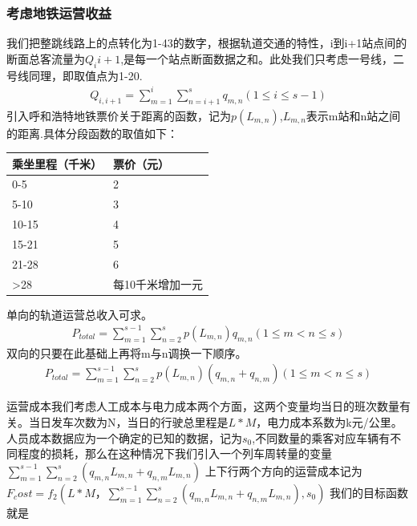 \documentclass[12pt,a4paper]{mcmthesis}
\begin{document}
\subsubsection{考虑地铁运营收益}
我们把整跳线路上的点转化为1-43的数字，根据轨道交通的特性，i到i+1站点间的断面总客流量为$Q_{i}{i+1}$,是每一个站点断面数据之和。此处我们只考虑一号线，二号线同理，即取值点为1-20.
\begin{equation}
	\begin{aligned}
		Q_{i,i+1}=\sum_{m=1}^{i}\sum_{n=i+1}^{s}q_{m,n}(1\leqslant i\leqslant s-1)
	\end{aligned}
\end{equation}
引入呼和浩特地铁票价关于距离的函数，记为$p(L_{m,n})$,$L_{m,n}$表示m站和n站之间的距离.具体分段函数的取值如下：
\begin{table}
	\centering
	\begin{tabular}{|l|l|}
		\hline
		乘坐里程（千米） & 票价（元） \\ \hline
		0-5 & 2 \\ \hline
		5-10 & 3 \\ \hline
		10-15 & 4 \\ \hline
		15-21 & 5 \\ \hline
		21-28 & 6 \\ \hline
		>28 &  每10千米增加一元 \\ \hline
	\end{tabular}
\end{table}
单向的轨道运营总收入可求。
\begin{equation}
	\begin{aligned}
		P_{total}=\sum_{m=1}^{s-1}\sum_{n=2}^{s}p(L_{m,n})q_{m,n} (1\leqslant m< n\leq s)
	\end{aligned}
\end{equation}
双向的只要在此基础上再将m与n调换一下顺序。
\begin{equation}
	\begin{aligned}
	P_{total}=\sum_{m=1}^{s-1}\sum_{n=2}^{s}p(L_{m,n})(q_{m,n}+q_{n,m}) (1\leqslant m< n\leq s)
	\end{aligned}
\end{equation}

运营成本我们考虑人工成本与电力成本两个方面，这两个变量均当日的班次数量有关。当日发车次数为N，当日的行驶总里程是$L*M$，电力成本系数为k元/公里。人员成本数据应为一个确定的已知的数据，记为$s_0$,不同数量的乘客对应车辆有不同程度的损耗，那么在这种情况下我们引入一个列车周转量的变量$\sum_{m=1}^{s-1}\sum_{n=2}^{s}(q_{m,n}L_{m,n}+q_{n,m}L_{m,n})$
上下行两个方向的运营成本记为$F_cost=f_2(L*M，\sum_{m=1}^{s-1}\sum_{n=2}^{s}(q_{m,n}L_{m,n}+q_{n,m}L_{m,n}),s_0)$
我们的目标函数就是
\end{document}
